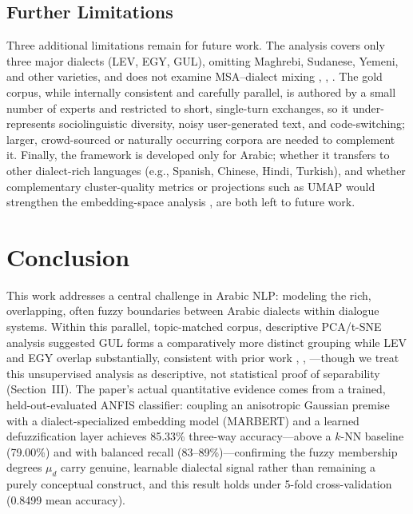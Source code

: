 \documentclass[conference]{IEEEtran}
\begin{document}
\subsection{Further Limitations}
Three additional limitations remain for future work. The analysis covers only three major dialects (LEV, EGY, GUL), omitting Maghrebi, Sudanese, Yemeni, and other varieties, and does not examine MSA--dialect mixing \cite{habash2012}, \cite{altwairesh2018}, \cite{elhaj2021}. The gold corpus, while internally consistent and carefully parallel, is authored by a small number of experts and restricted to short, single-turn exchanges, so it under-represents sociolinguistic diversity, noisy user-generated text, and code-switching; larger, crowd-sourced or naturally occurring corpora are needed to complement it. Finally, the framework is developed only for Arabic; whether it transfers to other dialect-rich languages (e.g., Spanish, Chinese, Hindi, Turkish), and whether complementary cluster-quality metrics or projections such as UMAP would strengthen the embedding-space analysis \cite{vandermaaten2008}, are both left to future work.

\section{Conclusion}
This work addresses a central challenge in Arabic NLP: modeling the rich, overlapping, often fuzzy boundaries between Arabic dialects within dialogue systems. Within this parallel, topic-matched corpus, descriptive PCA/t-SNE analysis suggested GUL forms a comparatively more distinct grouping while LEV and EGY overlap substantially, consistent with prior work \cite{habash2012}, \cite{altwairesh2018}, \cite{elhaj2021}---though we treat this unsupervised analysis as descriptive, not statistical proof of separability (Section~III). The paper's actual quantitative evidence comes from a trained, held-out-evaluated ANFIS classifier: coupling an anisotropic Gaussian premise with a dialect-specialized embedding model (MARBERT) and a learned defuzzification layer achieves 85.33\% three-way accuracy---above a $k$-NN baseline (79.00\%) and with balanced recall (83--89\%)---confirming the fuzzy membership degrees $\mu_d$ carry genuine, learnable dialectal signal rather than remaining a purely conceptual construct, and this result holds under 5-fold cross-validation (0.8499 mean accuracy).
\end{document}
